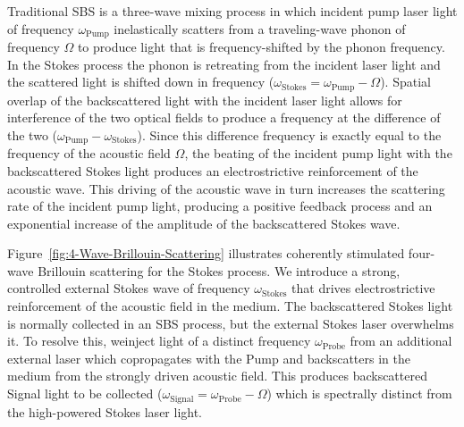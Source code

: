 Traditional \ac{SBS} is a three-wave mixing process in which incident pump laser light of frequency \(\omega_{\mathrm{Pump}}\) inelastically scatters from a traveling-wave phonon of frequency \(\Omega\) to produce light that is frequency-shifted by the phonon frequency. In the Stokes process the phonon is retreating from the incident laser light and the scattered light is shifted down in frequency (\(\omega_{\mathrm{Stokes}} = \omega_{\mathrm{Pump}} - \Omega\)). Spatial overlap of the backscattered light with the incident laser light allows for interference of the two optical fields to produce a frequency at the difference of the two (\(\omega_{\mathrm{Pump}} - \omega_{\mathrm{Stokes}}\)). Since this difference frequency is exactly equal to the frequency of the acoustic field \(\Omega\), the beating of the incident pump light with the backscattered Stokes light produces an electrostrictive reinforcement of the acoustic wave. This driving of the acoustic wave in turn increases the scattering rate of the incident pump light, producing a positive feedback process and an exponential increase of the amplitude of the backscattered Stokes wave.

Figure~\ref{fig:4-Wave-Brillouin-Scattering} illustrates coherently stimulated four-wave Brillouin scattering for the Stokes process. We introduce a strong, controlled external Stokes wave of frequency \(\omega_{\mathrm{Stokes}}\) that drives electrostrictive reinforcement of the acoustic field in the medium. The backscattered Stokes light is normally collected in an \ac{SBS} process, but the external Stokes laser overwhelms it. To resolve this, weinject light of a distinct frequency \(\omega_{\mathrm{Probe}}\) from an additional external laser which copropagates with the Pump and backscatters in the medium from the strongly driven acoustic field. This produces backscattered Signal light to be collected (\(\omega_{\mathrm{Signal}} = \omega_{\mathrm{Probe}} - \Omega\)) which is spectrally distinct from the high-powered Stokes laser light.

